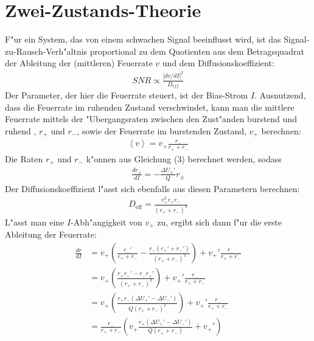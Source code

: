 \documentclass[12pt,a4paper]{article}
\begin{document}
\section{Zwei-Zustands-Theorie} 
F"ur ein System, das von einem schwachen Signal beeinflusst wird, ist das Signal-zu-Rausch-Verh"altnis proportional zu dem Quotienten aus dem Betragsquadrat der Ableitung der (mittleren) Feuerrate $v$ und dem Diffusionskoeffizient:
\begin{align*}
SNR \propto \frac{|dv/dI|^2}{D_{eff}}
\end{align*}
Der Parameter, der hier die Feuerrate steuert, ist der Bias-Strom $I$. Ausnutzend, dass die Feuerrate im ruhenden Zustand verschwindet, kann man die mittlere Feuerrate mittels der "Ubergangsraten zwischen den Zust"anden \glqq burstend \grqq und \glqq ruhend \grqq , $r_+$ und $r_-$, sowie der Feuerrate im burstenden Zustand, $v_+$ berechnen:
\begin{align*}
\left<v\right>=v_+\frac{r_-}{r_++r_-}
\end{align*}
Die Raten $r_+$ und $r_-$ k"onnen aus Gleichung (3) berechnet werden, sodass
\begin{eqnarray}
\frac{dr_\pm}{dI}=-\frac{\Delta U_\pm' }{Q}r_\pm
\end{eqnarray}
Der Diffusionskoeffizient l"asst sich ebenfalls aus diesen Parametern berechnen:
\begin{align*}
D_{\text{eff}}=\frac{v_+^2 r_+r_-}{(r_++r_-)^3}
\end{align*}
L"asst man eine $I$-Abh"angigkeit von $v_+$ zu, ergibt sich dann f"ur die erste Ableitung der Feuerrate:
\begin{align*}
\frac{dr}{dI}&=v_+\left(\frac{r_-'}{r_++r_-}-\frac{r_-(r_+'+r_-')}{(r_++r_-)^2}\right)+v_+'\frac{r_-}{r_++r_-}\\
&=v_+\left(\frac{r_+r_-'-r_-r_+'}{(r_++r_-)^2}\right)+v_+'\frac{r_-}{r_++r_-}\\
&=v_+\left(\frac{r_+r_-(\Delta U_+'-\Delta U_-')}{Q(r_++r_-)^2}\right)+v_+'\frac{r_-}{r_++r_-}\\
&=\frac{r_-}{r_++r_-}\left(v_+\frac{r_+(\Delta U_+'-\Delta U_-')}{Q(r_++r_-)}+v_+'\right)
\end{align*}
\end{document}
